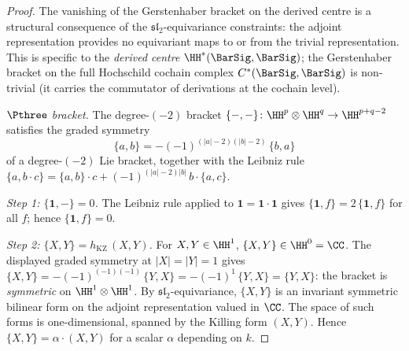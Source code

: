 \begin{proof}
The vanishing of the Gerstenhaber bracket on the derived
centre is a structural consequence of the
$\mathfrak{sl}_2$-equivariance constraints: the adjoint
representation provides no equivariant maps to or from the
trivial representation. This is specific to the
\emph{derived centre} $\HH^*(\BarSig, \BarSig)$; the
Gerstenhaber bracket on the full Hochschild cochain complex
$C^*(\BarSig, \BarSig)$ is non-trivial (it carries the
commutator of derivations at the cochain level).

\textit{$\Pthree$ bracket.}
The degree-$(-2)$ bracket
$\{-,-\}\colon \HH^p \otimes \HH^q \to \HH^{p+q-2}$
satisfies the graded symmetry
\begin{equation}\label{eq:p3-symmetry}
 \{a, b\}
 = -(-1)^{(|a|-2)(|b|-2)}\,\{b, a\}
\end{equation}
of a degree-$(-2)$ Lie bracket, together with the Leibniz rule
$\{a, b \cdot c\}
= \{a, b\} \cdot c + (-1)^{(|a|-2)|b|}\,b \cdot \{a, c\}$.

\textit{Step 1: $\{\mathbf{1}, -\} = 0$.}
The Leibniz rule applied to
$\mathbf{1} = \mathbf{1} \cdot \mathbf{1}$ gives
$\{\mathbf{1}, f\} = 2\,\{\mathbf{1}, f\}$
for all $f$; hence $\{\mathbf{1}, f\} = 0$.

\textit{Step 2: $\{X, Y\} = h_{\mathrm{KZ}}\,(X, Y)$.}
For $X, Y \in \HH^1$,
$\{X, Y\} \in \HH^0 = \CC$.
The displayed graded symmetry at
$|X| = |Y| = 1$ gives
$\{X, Y\} = -(-1)^{(-1)(-1)}\,\{Y, X\}
= -(-1)^1\,\{Y, X\}
= \{Y, X\}$:
the bracket is \emph{symmetric} on $\HH^1 \otimes \HH^1$.
By $\mathfrak{sl}_2$-equivariance, $\{X, Y\}$ is an
invariant symmetric bilinear form on the adjoint
representation valued in $\CC$. The space of such forms is
one-dimensional, spanned by the Killing form $(X, Y)$.
Hence $\{X, Y\} = \alpha \cdot (X, Y)$ for a scalar
$\alpha$ depending on $k$.


\end{proof}
